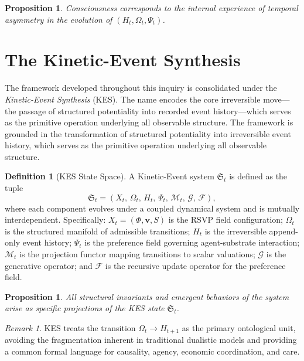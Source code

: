 \documentclass[11pt,a4paper]{article}
\newtheorem{proposition}[theorem]{Proposition}
\theoremstyle{definition}
\newtheorem{definition}[theorem]{Definition}
\theoremstyle{remark}
\newtheorem{remark}[theorem]{Remark}
\begin{document}
\begin{proposition}
Consciousness corresponds to the internal experience of temporal asymmetry in the evolution of $(H_t, \Omega_t, \Psi_t)$.
\end{proposition}

\section{The Kinetic-Event Synthesis}

The framework developed throughout this inquiry is consolidated under the \emph{Kinetic-Event Synthesis} (KES). The name encodes the core irreversible move---the passage of structured potentiality into recorded event history---which serves as the primitive operation underlying all observable structure. The framework is grounded in the transformation of structured potentiality into irreversible event history, which serves as the primitive operation underlying all observable structure.

\begin{definition}[KES State Space]
A Kinetic-Event system $\mathfrak{S}_t$ is defined as the tuple
\[
\mathfrak{S}_t = (X_t,\, \Omega_t,\, H_t,\, \Psi_t,\, \mathcal{M}_t,\, \mathcal{G},\, \mathcal{F}),
\]
where each component evolves under a coupled dynamical system and is mutually interdependent. Specifically: $X_t = (\Phi, \mathbf{v}, S)$ is the RSVP field configuration; $\Omega_t$ is the structured manifold of admissible transitions; $H_t$ is the irreversible append-only event history; $\Psi_t$ is the preference field governing agent-substrate interaction; $\mathcal{M}_t$ is the projection functor mapping transitions to scalar valuations; $\mathcal{G}$ is the generative operator; and $\mathcal{F}$ is the recursive update operator for the preference field.
\end{definition}

\begin{proposition}
All structural invariants and emergent behaviors of the system arise as specific projections of the KES state $\mathfrak{S}_t$.
\end{proposition}

\begin{remark}
KES treats the transition $\Omega_t \to H_{t+1}$ as the primary ontological unit, avoiding the fragmentation inherent in traditional dualistic models and providing a common formal language for causality, agency, economic coordination, and care.
\end{remark}
\end{document}
